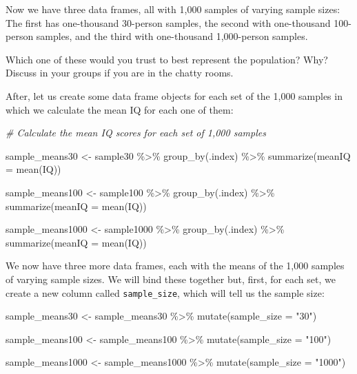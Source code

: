 \documentclass[
]{book}
\newenvironment{Shaded}{\begin{snugshade}}{\end{snugshade}}
\newcommand{\AttributeTok}[1]{\textcolor[rgb]{0.77,0.63,0.00}{#1}}
\newcommand{\CommentTok}[1]{\textcolor[rgb]{0.56,0.35,0.01}{\textit{#1}}}
\newcommand{\FunctionTok}[1]{\textcolor[rgb]{0.00,0.00,0.00}{#1}}
\newcommand{\NormalTok}[1]{#1}
\newcommand{\OtherTok}[1]{\textcolor[rgb]{0.56,0.35,0.01}{#1}}
\newcommand{\SpecialCharTok}[1]{\textcolor[rgb]{0.00,0.00,0.00}{#1}}
\newcommand{\StringTok}[1]{\textcolor[rgb]{0.31,0.60,0.02}{#1}}
\begin{document}
Now we have three data frames, all with 1,000 samples of varying sample sizes: The first has one-thousand 30-person samples, the second with one-thousand 100-person samples, and the third with one-thousand 1,000-person samples.

Which one of these would you trust to best represent the population? Why? Discuss in your groups if you are in the chatty rooms.

After, let us create some data frame objects for each set of the 1,000 samples in which we calculate the mean IQ for each one of them:

\begin{Shaded}
\begin{Highlighting}[]
\CommentTok{\# Calculate the mean IQ scores for each set of 1,000 samples }

\NormalTok{sample\_means30 }\OtherTok{\textless{}{-}}\NormalTok{ sample30 }\SpecialCharTok{\%\textgreater{}\%} 
  \FunctionTok{group\_by}\NormalTok{(.index) }\SpecialCharTok{\%\textgreater{}\%} 
  \FunctionTok{summarize}\NormalTok{(}\AttributeTok{meanIQ =} \FunctionTok{mean}\NormalTok{(IQ))}

\NormalTok{sample\_means100 }\OtherTok{\textless{}{-}}\NormalTok{ sample100 }\SpecialCharTok{\%\textgreater{}\%} 
  \FunctionTok{group\_by}\NormalTok{(.index) }\SpecialCharTok{\%\textgreater{}\%} 
  \FunctionTok{summarize}\NormalTok{(}\AttributeTok{meanIQ =} \FunctionTok{mean}\NormalTok{(IQ)) }

\NormalTok{sample\_means1000 }\OtherTok{\textless{}{-}}\NormalTok{ sample1000 }\SpecialCharTok{\%\textgreater{}\%} 
  \FunctionTok{group\_by}\NormalTok{(.index) }\SpecialCharTok{\%\textgreater{}\%} 
  \FunctionTok{summarize}\NormalTok{(}\AttributeTok{meanIQ =} \FunctionTok{mean}\NormalTok{(IQ)) }
\end{Highlighting}
\end{Shaded}

We now have three more data frames, each with the means of the 1,000 samples of varying sample sizes. We will bind these together but, first, for each set, we create a new column called \texttt{sample\_size}, which will tell us the sample size:

\begin{Shaded}
\begin{Highlighting}[]
\NormalTok{sample\_means30 }\OtherTok{\textless{}{-}}\NormalTok{ sample\_means30 }\SpecialCharTok{\%\textgreater{}\%} \FunctionTok{mutate}\NormalTok{(}\AttributeTok{sample\_size =} \StringTok{"30"}\NormalTok{)}

\NormalTok{sample\_means100 }\OtherTok{\textless{}{-}}\NormalTok{ sample\_means100 }\SpecialCharTok{\%\textgreater{}\%} \FunctionTok{mutate}\NormalTok{(}\AttributeTok{sample\_size =} \StringTok{"100"}\NormalTok{)}

\NormalTok{sample\_means1000 }\OtherTok{\textless{}{-}}\NormalTok{ sample\_means1000 }\SpecialCharTok{\%\textgreater{}\%} \FunctionTok{mutate}\NormalTok{(}\AttributeTok{sample\_size =} \StringTok{"1000"}\NormalTok{)}
\end{Highlighting}
\end{Shaded}
\end{document}
